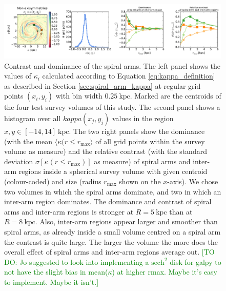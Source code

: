 \documentclass[iop,revtex4,numberedappendix,appendixfloats]{emulateapj}
\newcommand{\HW}[1]{\textcolor{Green}{#1}}
\begin{document}
\begin{figure}[!htbp]
\centering
\includegraphics[width=\textwidth]{fig/whole_galaxy_kappa_i.pdf}
\caption{Contrast and dominance of the spiral arms. The left panel shows the values of $\kappa_i$ calculated according to Equation \ref{eq:kappa_definition} as described in Section \ref{sec:spiral_arm_kappa} at regular grid points $(x_i,y_i)$ with bin width $0.25~\text{kpc}$. Marked are the centroids of the four test survey volumes of this study. The second panel shows a histogram over all $kappa(x_j,y_j)$ values in the region $x,y \in [-14,14]~\text{kpc}$. The two right panels show the dominance (with the mean $\langle \kappa (r \leq r_\text{max} \rangle$ of all grid points within the survey volume as measure) and the relative contrast (with the standard deviation $\sigma[\kappa (r \leq r_\text{max})]$ as measure) of spiral arms and inter-arm regions inside a spherical survey volume with given centroid (colour-coded) and size (radius $r_\text{max}$ shown on the $x$-axis). We chose two volumes in which the spiral arms dominate, and two in which an inter-arm region dominates. The dominance and contrast of spiral arms and inter-arm regions is stronger at $R=5~\text{kpc}$ than at $R=8~\text{kpc}$. Also, inter-arm regions appear larger and smoother than spiral arms, as already inside a small volume centred on a spiral arm the contrast is quite large. The larger the volume the more does the overall effect of spiral arms and inter-arm regions average out. \HW{[TO DO: Jo suggested to look into implementing a $\text{sech}^2$ disk for galpy to not have the slight bias in mean($\kappa$) at higher rmax. Maybe it's easy to implement. Maybe it isn't.]}}
\label{fig:spiral_arm_kappa}
\end{figure}


\end{document}
